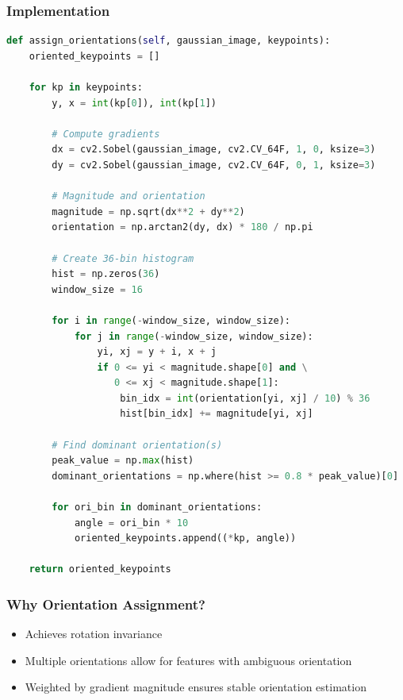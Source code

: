 \documentclass[12pt,a4paper]{article}
\begin{document}
\subsubsection{Implementation}
\begin{lstlisting}[language=Python]
def assign_orientations(self, gaussian_image, keypoints):
    oriented_keypoints = []
    
    for kp in keypoints:
        y, x = int(kp[0]), int(kp[1])
        
        # Compute gradients
        dx = cv2.Sobel(gaussian_image, cv2.CV_64F, 1, 0, ksize=3)
        dy = cv2.Sobel(gaussian_image, cv2.CV_64F, 0, 1, ksize=3)
        
        # Magnitude and orientation
        magnitude = np.sqrt(dx**2 + dy**2)
        orientation = np.arctan2(dy, dx) * 180 / np.pi
        
        # Create 36-bin histogram
        hist = np.zeros(36)
        window_size = 16
        
        for i in range(-window_size, window_size):
            for j in range(-window_size, window_size):
                yi, xj = y + i, x + j
                if 0 <= yi < magnitude.shape[0] and \
                   0 <= xj < magnitude.shape[1]:
                    bin_idx = int(orientation[yi, xj] / 10) % 36
                    hist[bin_idx] += magnitude[yi, xj]
        
        # Find dominant orientation(s)
        peak_value = np.max(hist)
        dominant_orientations = np.where(hist >= 0.8 * peak_value)[0]
        
        for ori_bin in dominant_orientations:
            angle = ori_bin * 10
            oriented_keypoints.append((*kp, angle))
    
    return oriented_keypoints
\end{lstlisting}

\subsubsection{Why Orientation Assignment?}
\begin{itemize}
    \item Achieves rotation invariance
    \item Multiple orientations allow for features with ambiguous orientation
    \item Weighted by gradient magnitude ensures stable orientation estimation
\end{itemize}
\end{document}
